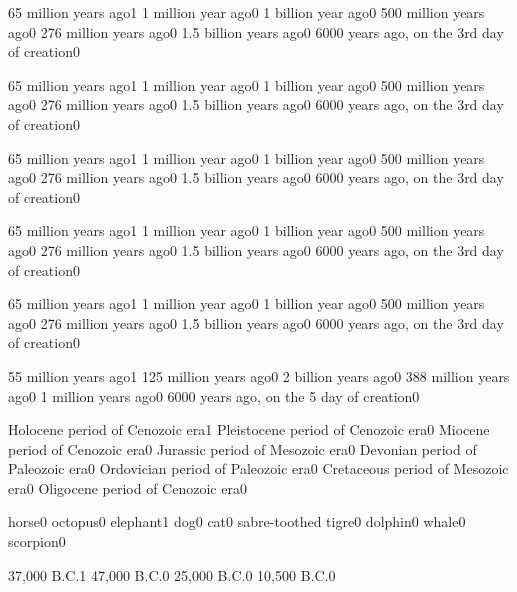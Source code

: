 {65 million years ago}{1}
{1 million year ago}{0}
{1 billion year ago}{0}
{500 million years ago}{0}
{276 million years ago}{0}
{1.5 billion years ago}{0}
{6000 years ago, on the 3rd day of creation}{0}
\qstop

{65 million years ago}{1}
{1 million year ago}{0}
{1 billion year ago}{0}
{500 million years ago}{0}
{276 million years ago}{0}
{1.5 billion years ago}{0}
{6000 years ago, on the 3rd day of creation}{0}
\qstop

{65 million years ago}{1}
{1 million year ago}{0}
{1 billion year ago}{0}
{500 million years ago}{0}
{276 million years ago}{0}
{1.5 billion years ago}{0}
{6000 years ago, on the 3rd day of creation}{0}
\qstop

{65 million years ago}{1}
{1 million year ago}{0}
{1 billion year ago}{0}
{500 million years ago}{0}
{276 million years ago}{0}
{1.5 billion years ago}{0}
{6000 years ago, on the 3rd day of creation}{0}
\qstop

{65 million years ago}{1}
{1 million year ago}{0}
{1 billion year ago}{0}
{500 million years ago}{0}
{276 million years ago}{0}
{1.5 billion years ago}{0}
{6000 years ago, on the 3rd day of creation}{0}
\qstop

{55 million years ago}{1}
{125 million years ago}{0}
{2 billion years ago}{0}
{388 million years ago}{0}
{1 million years ago}{0}
{6000 years ago, on the 5 day of creation}{0}
\qstop


{Holocene period of Cenozoic era}{1}
{Pleistocene period of Cenozoic era}{0}
{Miocene period of Cenozoic era}{0}
{Jurassic period of Mesozoic era}{0}
{Devonian period of Paleozoic era}{0}
{Ordovician period of Paleozoic era}{0}
{Cretaceous period of Mesozoic era}{0}
{Oligocene period of Cenozoic era}{0}
\qstop

{horse}{0}
{octopus}{0}
{elephant}{1}
{dog}{0}
{cat}{0}
{sabre-toothed tigre}{0}
{dolphin}{0}
{whale}{0}
{scorpion}{0}
\qstop

{37,000 B.C.}{1}
{47,000 B.C.}{0}
{25,000 B.C.}{0}
{10,500 B.C.}{0}
\qstop

